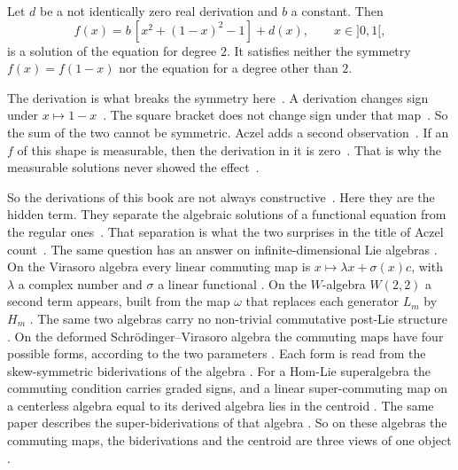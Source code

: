 \begin{example}\label{ex:fi:aczel-alpha-two}
Let $d$ be a not identically zero real derivation and $b$ a constant. Then
\[
  f(x) = b\,[x^2 + (1-x)^2 - 1] + d(x), \qquad x \in {]0,1[},
\]
is a solution of the equation for degree $2$. It satisfies neither the
symmetry $f(x) = f(1-x)$ nor the equation for a degree other than $2$.
\end{example}

The derivation is what breaks the symmetry
here~\cite[p.~199]{Aczel1981}. A derivation changes sign under $x \mapsto
1-x$~\cite[p.~199]{Aczel1981}. The square bracket does not change sign under
that map~\cite[p.~199]{Aczel1981}. So the sum of the two cannot be symmetric.
Aczel adds a second observation~\cite[p.~199]{Aczel1981}. If an $f$ of this
shape is measurable, then the derivation in it is
zero~\cite[p.~199]{Aczel1981}. That is why the measurable solutions never
showed the effect~\cite[p.~199]{Aczel1981}.

So the derivations of this book are not always
constructive~\cite[p.~191]{Aczel1981}. Here they are the hidden term. They
separate the algebraic solutions of a functional equation from the regular
ones~\cite[p.~199]{Aczel1981}. That separation is what the two surprises in
the title of Aczel count~\cite[p.~191]{Aczel1981}. The same question has an
answer on infinite-dimensional Lie algebras \cite[p.~1]{Tang2016W22}. On the
Virasoro algebra every linear commuting map is $x\mapsto\lambda x+\sigma(x)c$,
with $\lambda$ a complex number and $\sigma$ a linear functional
\cite[Theorem~4.2, p.~9]{Tang2016W22}. On the $W$-algebra $W(2,2)$ a second
term appears, built from the map $\omega$ that replaces each generator $L_m$
by $H_m$ \cite[Theorem~4.1, p.~9]{Tang2016W22}. The same two algebras carry no
non-trivial commutative post-Lie structure \cite[Theorem~4.6,
p.~10]{Tang2016W22}. On the deformed Schr\"odinger--Virasoro algebra the
commuting maps have four possible forms, according to the two parameters
\cite[Theorem~4.3, p.~11]{FanSuXu2016}. Each form is read from the
skew-symmetric biderivations of the algebra \cite[Theorem~3.2,
p.~4]{FanSuXu2016}. For a Hom-Lie superalgebra the commuting condition carries
graded signs, and a linear super-commuting map on a centerless algebra equal
to its derived algebra lies in the centroid \cite[Theorem~4.2,
p.~11]{Pandey2024Superbiderivations}. The same paper describes the
super-biderivations of that algebra \cite[Theorem~3.8,
p.~7]{Pandey2024Superbiderivations}. So on these algebras the commuting maps,
the biderivations and the centroid are three views of one object
\cite[p.~1]{Pandey2024Superbiderivations}.
